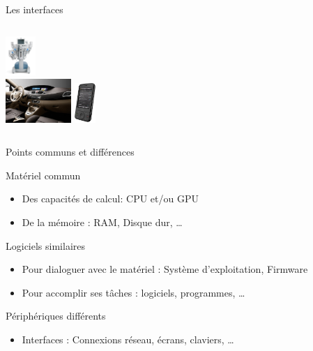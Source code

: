 \begin{frame}{Les interfaces}
\begin{columns}
\begin{column}[T]{5cm}
      \includegraphics[height = 1.5cm]{img/s01/Davinci-Robot-chirurgical-001.jpg}\\
      \includegraphics[width =
      2.5cm]{img/s01/scenic_console_centrale.png}\hspace{1cm}
      \includegraphics[height = 1.5cm]{img/s01/telephone_tc_linux.png}
    \end{column}
  \end{columns}
\end{frame}

\begin{frame}{Points communs et différences}
  \begin{block}{Matériel commun}
    \begin{itemize}
    \item Des capacités de calcul: CPU et/ou GPU
    \item De la mémoire : RAM, Disque dur, \dots
    \end{itemize}
  \end{block}
  \begin{block}{Logiciels similaires}
    \begin{itemize}
    \item Pour dialoguer avec le matériel : Système d'exploitation, Firmware
    \item Pour accomplir ses tâches : logiciels, programmes, \dots
    \end{itemize}
  \end{block}
  \begin{alertblock}{Périphériques différents}
    \begin{itemize}
    \item Interfaces : Connexions réseau, écrans, claviers, \dots
    \end{itemize}
  \end{alertblock}
\end{frame}

